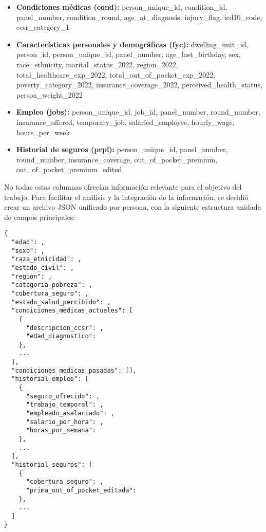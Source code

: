 \documentclass[12pt,a4paper]{article}
\begin{document}
\begin{itemize}
    \item \textbf{Condiciones médicas (cond):} person\_unique\_id, condition\_id, panel\_number, condition\_round, age\_at\_diagnosis, injury\_flag, icd10\_code, ccsr\_category\_1
    \item \textbf{Características personales y demográficas (fyc):} dwelling\_unit\_id, person\_id, person\_unique\_id, panel\_number, age\_last\_birthday, sex, race\_ethnicity, marital\_status\_2022, region\_2022, total\_healthcare\_exp\_2022, total\_out\_of\_pocket\_exp\_2022, poverty\_category\_2022, insurance\_coverage\_2022, perceived\_health\_status, person\_weight\_2022
    \item \textbf{Empleo (jobs):} person\_unique\_id, job\_id, panel\_number, round\_number, insurance\_offered, temporary\_job, salaried\_employee, hourly\_wage, hours\_per\_week
    \item \textbf{Historial de seguros (prpl):} person\_unique\_id, panel\_number, round\_number, insurance\_coverage, out\_of\_pocket\_premium, out\_of\_pocket\_premium\_edited
\end{itemize}

No todas estas columnas ofrecían información relevante para el objetivo del trabajo. Para facilitar el análisis y la integración de la información, se decidió crear un archivo JSON unificado por persona, con la siguiente estructura anidada de campos principales:

\begin{verbatim}
{
  "edad": ,
  "sexo": ,
  "raza_etnicidad": ,
  "estado_civil": ,
  "region": ,
  "categoria_pobreza": ,
  "cobertura_seguro": ,
  "estado_salud_percibido": ,
  "condiciones_medicas_actuales": [
    {
      "descripcion_ccsr": ,
      "edad_diagnostico": 
    },
    ...
  ],
  "condiciones_medicas_pasadas": [],
  "historial_empleo": [
    {
      "seguro_ofrecido": ,
      "trabajo_temporal": ,
      "empleado_asalariado": ,
      "salario_por_hora": ,
      "horas_por_semana": 
    },
    ...
  ],
  "historial_seguros": [
    {
      "cobertura_seguro": ,
      "prima_out_of_pocket_editada": 
    },
    ...
  ]
}
\end{verbatim}
\end{document}
